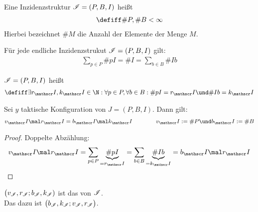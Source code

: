 \begin{definition}
	Eine Inzidenzstruktur $\mathscr{I}=(P,B,I)$ heißt 
	\begin{align*}
		\defiff \#P,\#B<\infty
	\end{align*}
	Hierbei bezeichnet $\#M$ die Anzahl der Elemente der Menge $M$.
\end{definition}

\begin{satz}\enter
	Für jede endliche Inzidenzstrukut $\mathscr{I}=(P,B,I)$ gilt:
	\begin{align*}
		\sum\limits_{p\in P}\# pI=\#I=\sum\limits_{b\in B}\# Ib
	\end{align*}
\end{satz}

\begin{definition}
	$\mathscr{I}=(P,B,I)$ heißt 
	\begin{align*}
		\defiff\exists r_\Inz,k_\Inz\in\N:\forall p\in P,\forall b\in B:\# pI=r_\Inz\und\#Ib=k_\Inz
	\end{align*}
\end{definition}

\begin{lemma}
	Sei $y$ taktische Konfiguration von $J=(P,B,I)$. Dann gilt:
	\begin{align*}
		v_\Inz\mal r_\Inz=b_\Inz\mal k_\Inz
		\qquad\mit\qquad
		v_\Inz:=\# P\und b_\Inz:=\#B
	\end{align*}
\end{lemma}

\begin{proof}
	Doppelte Abzählung: 
	\begin{align*}
		v_\Inz\mal r_\Inz=\sum\limits_{p\in P}\underbrace{\# pI}_{=r_\Inz}=\sum\limits_{b\in B}\underbrace{\#Ib}_{=k_\Inz}=b_\Inz\mal r_\Inz
	\end{align*}
\end{proof}


\begin{definition}
	$\big(v_{\mathscr{I}},r_{\mathscr{I}};b_{\mathscr{I}},k_{\mathscr{I}})$ ist das  von $\mathscr{I}$.
	\\
	Das dazu  ist $\big(b_{\mathscr{I}},k_{\mathscr{I}};v_{\mathscr{I}},r_{\mathscr{I}}\big)$.
\end{definition}

